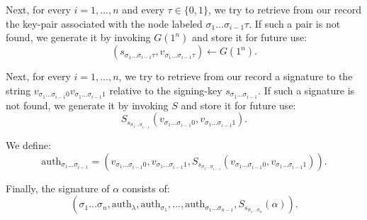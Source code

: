 Next, for every $i = 1, ..., n$ and every $\tau \in \{0,1\}$, we try to retrieve from our record the key-pair associated with the node labeled $\sigma_1 \dots \sigma_{i-1}\tau$. If such a pair is not found, we generate it by invoking $G(1^n)$ and store it for future use:
\[
(s_{\sigma_1 \dots \sigma_{i-1}\tau}, v_{\sigma_1 \dots \sigma_{i-1}\tau}) \leftarrow G(1^n).
\]

Next, for every $i = 1, ..., n$, we try to retrieve from our record a signature to the string $v_{\sigma_1 \dots \sigma_{i-1}0} v_{\sigma_1 \dots \sigma_{i-1}1}$ relative to the signing-key $s_{\sigma_1 \dots \sigma_{i-1}}$. If such a signature is not found, we generate it by invoking $S$ and store it for future use:
\[
S_{s_{\sigma_1 \dots \sigma_{i-1}}}(v_{\sigma_1 \dots \sigma_{i-1}0}, v_{\sigma_1 \dots \sigma_{i-1}1}).
\]

We define:
\[
\text{auth}_{\sigma_1 \dots \sigma_{i-1}} = (v_{\sigma_1 \dots \sigma_{i-1}0}, v_{\sigma_1 \dots \sigma_{i-1}1}, S_{s_{\sigma_1 \dots \sigma_{i-1}}}(v_{\sigma_1 \dots \sigma_{i-1}0}, v_{\sigma_1 \dots \sigma_{i-1}1})).
\]

Finally, the signature of $\alpha$ consists of:
\[
(\sigma_1 \dots \sigma_n, \text{auth}_\lambda, \text{auth}_{\sigma_1}, ..., \text{auth}_{\sigma_1 \dots \sigma_{n-1}}, S_{s_{\sigma_1 \dots \sigma_n}}(\alpha)).
\]

